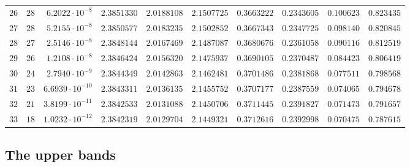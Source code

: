 {\begin{longtable}{@{}rrrrrrrrrr@{}}
$26$ & $28$ & $6.2022\cdot10^{-8}$ & $2.3851330$ & $2.0188108$ & $2.1507725$ & $0.3663222$ & $0.2343605$ & $0.100623$ & $0.823435$\\
$27$ & $28$ & $5.2155\cdot10^{-8}$ & $2.3850577$ & $2.0183235$ & $2.1502852$ & $0.3667343$ & $0.2347725$ & $0.098140$ & $0.820845$\\
$28$ & $27$ & $2.5146\cdot10^{-8}$ & $2.3848144$ & $2.0167469$ & $2.1487087$ & $0.3680676$ & $0.2361058$ & $0.090116$ & $0.812519$\\
$29$ & $26$ & $1.2108\cdot10^{-8}$ & $2.3846424$ & $2.0156320$ & $2.1475937$ & $0.3690105$ & $0.2370487$ & $0.084423$ & $0.806419$\\
$30$ & $24$ & $2.7940\cdot10^{-9}$ & $2.3844349$ & $2.0142863$ & $2.1462481$ & $0.3701486$ & $0.2381868$ & $0.077511$ & $0.798568$\\
$31$ & $23$ & $6.6939\cdot10^{-10}$ & $2.3843311$ & $2.0136135$ & $2.1455752$ & $0.3707177$ & $0.2387559$ & $0.074065$ & $0.794678$\\
$32$ & $21$ & $3.8199\cdot10^{-11}$ & $2.3842533$ & $2.0131088$ & $2.1450706$ & $0.3711445$ & $0.2391827$ & $0.071473$ & $0.791657$\\
$33$ & $18$ & $1.0232\cdot10^{-12}$ & $2.3842319$ & $2.0129704$ & $2.1449321$ & $0.3712616$ & $0.2392998$ & $0.070475$ & $0.787615$\\
\end{longtable}
}

\subsection{The upper bands}\label{subsec:data:upper}


